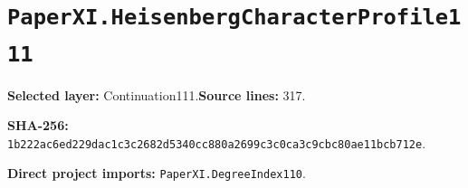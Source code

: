 \documentclass[10pt,oneside]{book}
\begin{document}
\section{\texorpdfstring{\nolinkurl{PaperXI.HeisenbergCharacterProfile111}}{PaperXI.HeisenbergCharacterProfile111}}\label{module:PaperXI.HeisenbergCharacterProfile111}

\textbf{Selected layer:} Continuation111.\quad\textbf{Source lines:} 317.\par\textbf{SHA-256:} {\scriptsize\nolinkurl{1b222ac6ed229dac1c3c2682d5340cc880a2699c3c0ca3c9cbc80ae11bcb712e}}.


\textbf{Direct project imports:} \nolinkurl{PaperXI.DegreeIndex110}.
\end{document}
